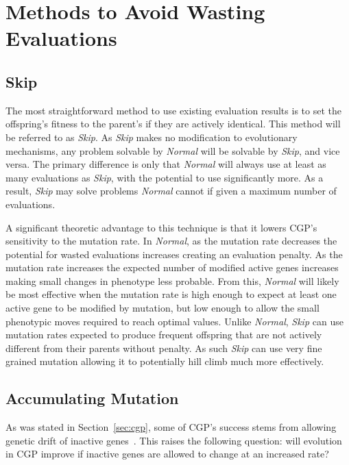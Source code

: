 \documentclass[runningheads,a4paper]{llncs}
\begin{document}
\section{Methods to Avoid Wasting Evaluations}
\subsection{Skip}
The most straightforward method to use existing evaluation results is to
set the offspring's fitness to the parent's
if they are actively identical. This method will be referred to as \emph{Skip}.
As \emph{Skip} makes no modification to evolutionary mechanisms, any problem
solvable by \emph{Normal} will be solvable by \emph{Skip}, and vice versa. The
primary difference is only that \emph{Normal} will always use at least as many
evaluations as \emph{Skip}, with the potential to use significantly more.  As
a result, \emph{Skip} may solve problems \emph{Normal} cannot if given a
maximum number of evaluations.

A significant theoretic advantage to this technique is that it lowers CGP's
sensitivity to the mutation rate.  In \emph{Normal}, as the mutation rate
decreases the potential for wasted evaluations
increases creating an evaluation penalty.  As the mutation rate increases the expected
number of modified active genes increases making small
changes in phenotype less probable. From this, \emph{Normal} will likely
be most effective when the mutation rate
is high enough to expect at least one active gene to be modified by
mutation, but low enough to allow the small phenotypic moves required
to reach optimal values.
Unlike \emph{Normal}, \emph{Skip} can use mutation rates expected to produce
frequent offspring that are not actively different from their parents without
penalty.  As such \emph{Skip} can use very fine grained mutation allowing it to potentially
hill climb much more effectively.

\subsection{Accumulating Mutation}
As was stated in Section~\ref{sec:cgp}, some of CGP's success stems
from allowing genetic drift of inactive genes~\cite{yu:2001:neutrality}.
This raises the following question: will evolution in CGP improve
if inactive genes are allowed to change at an increased rate?
\end{document}
